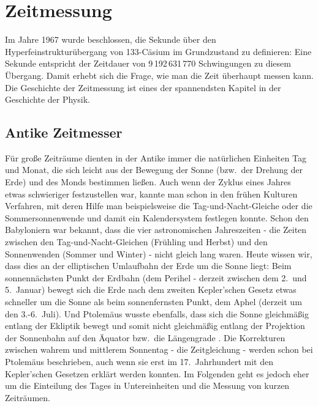 

\chapter{Zeitmessung}
\label{chap_Uhren}


Im Jahre 1967 wurde beschlossen, die Sekunde \"uber den Hyperfeinstruktur\"ubergang
von 133-C\"asium im Grundzustand zu definieren: Eine Sekunde entspricht der Zeitdauer von
9\,192\,631\,770 Schwingungen zu diesem \"Ubergang. 
Damit erhebt sich die Frage, wie man die Zeit
\"uberhaupt messen kann. Die Geschichte der Zeitmessung ist eines der spannendsten Kapitel
in der Geschichte der Physik. 

\section{Antike Zeitmesser}

F\"ur gro\ss e Zeitr\"aume dienten in der Antike immer die nat\"urlichen
Einheiten Tag und Monat, die sich leicht aus der Bewegung der Sonne (bzw.\ der Drehung der Erde) 
und des Monds bestimmen lie\ss en.
Auch wenn der Zyklus eines Jahres etwas schwieriger festzustellen war, kannte
man schon in den fr\"uhen Kulturen Verfahren, mit deren Hilfe man beispielsweise die Tag-und-Nacht-Gleiche
oder die Sommersonnenwende und damit ein Kalendersystem festlegen konnte. 
Schon den Babyloniern war bekannt, dass die vier astronomischen Jahreszeiten - die Zeiten
zwischen den Tag-und-Nacht-Gleichen (Fr\"uhling und Herbst) und den Sonnenwenden
(Sommer und Winter) - nicht gleich lang waren. Heute wissen wir, dass dies an der
elliptischen Umlaufbahn der Erde um die Sonne liegt: Beim sonnenn\"achsten Punkt der Erdbahn
(dem Perihel - derzeit zwischen dem 2.\ und 5.\ Januar) bewegt sich die Erde nach dem zweiten Kepler'schen
Gesetz etwas schneller um die Sonne als beim sonnen\-fernsten Punkt, dem Aphel (derzeit um den 3.-6.\ Juli).  
Und Ptolem\"aus wusste ebenfalls, dass sich die Sonne gleichm\"a\ss ig entlang der Ekliptik bewegt und somit
nicht gleichm\"a\ss ig entlang der Projektion der Sonnenbahn auf den \"Aquator 
bzw.\ die L\"angengrade \cite{Neugebauer}. Die Korrekturen zwischen
wahrem und mittlerem Sonnentag - die Zeitgleichung - werden schon bei Ptolem\"aus beschrieben, auch wenn
sie erst im 17.\ Jahrhundert mit den Kepler'schen Gesetzen erkl\"art werden konnten.
Im Folgenden geht es jedoch eher um die Einteilung des Tages in Untereinheiten und die Messung
von kurzen Zeitr\"aumen.

